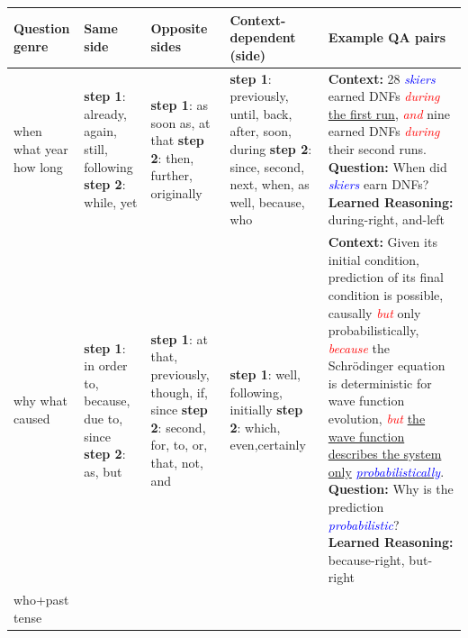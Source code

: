 



\begin{table}[t]
\centering
{
	\fontsize{9}{9}\selectfont
  \setlength{\tabcolsep}{1.0mm}
  \renewcommand{\arraystretch}{1.1}
	\begin{tabular}{|p{1.8cm}|p{2.5cm}|p{2.5cm}|p{2.5cm}|p{5.8cm}|}
 	\hline
 	\textbf{Question genre}  & \textbf{Same side}& \textbf{Opposite sides}& \textbf{Context-dependent (side)} &  \textbf{Example QA pairs} \\
 	\hline
 	when \newline what year \newline how long 
 	& \textbf{step 1}: already, again, still, following \newline\textbf{step 2}: while, yet & \textbf{step 1}: as soon as, at that \newline\newline \textbf{step 2}: then, further, originally
 	&\textbf{step 1}: previously, until, back, after, soon, during \newline \textbf{step 2}: since, second, next, when, as well, because, who 
	&  \textbf{Context: }28 \textit{\textcolor{blue}{skiers}} earned DNFs \textit{\textcolor{red}{during}} \underline{the first run}, \textit{\textcolor{red}{and}} nine earned DNFs \textit{\textcolor{red}{during}} their second runs.
  \newline \textbf{Question: }When did \textit{\textcolor{blue}{skiers}} earn DNFs? 
  \newline \textbf{Learned Reasoning: } during-right, and-left\\ 
	\hline
  why \newline what caused 
 &\textbf{step 1}: in order to, because, due to,  since \newline\textbf{step 2}: as, but &\textbf{step 1}: at that, previously, though, if, since \newline \textbf{step 2}: second, for, to, or, that, not, and & \textbf{step 1}: well, following, initially  \newline\newline\textbf{step 2}: which, even,certainly  
  & \textbf{Context: }Given its initial condition, prediction of its final condition is possible, causally \textit{\textcolor{red}{but}} only probabilistically, \textit{\textcolor{red}{because}} the Schrödinger equation is deterministic for wave function evolution, \textit{\textcolor{red}{but}} \underline{the wave function describes the system only} \underline{\textit{\textcolor{blue}{probabilistically}}}.
  \newline \textbf{Question: }Why is the prediction \textit{\textcolor{blue}{probabilistic}}?
  \newline \textbf{Learned Reasoning: }because-right, but-right\\ 
	\hline	
	who+past tense 


\end{tabular}}
\end{table}
